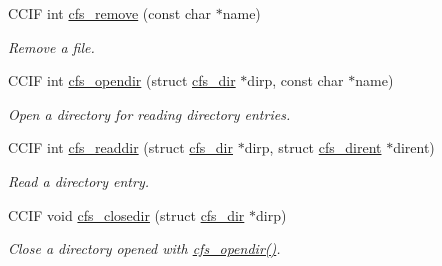 \begin{DoxyCompactItemize}
C\+C\+I\+F int \hyperlink{group__cfs_gacad1f14239db1a889ccf9804040e0d20}{cfs\+\_\+remove} (const char $\ast$name)
\begin{DoxyCompactList}\small\item\em Remove a file. \end{DoxyCompactList}\item 
C\+C\+I\+F int \hyperlink{group__cfs_gab4df33476a46ca00caf8de9cbb3e8f05}{cfs\+\_\+opendir} (struct \hyperlink{structcfs__dir}{cfs\+\_\+dir} $\ast$dirp, const char $\ast$name)
\begin{DoxyCompactList}\small\item\em Open a directory for reading directory entries. \end{DoxyCompactList}\item 
C\+C\+I\+F int \hyperlink{group__cfs_ga6367d2b762784fabea2ad1f533aa4bf4}{cfs\+\_\+readdir} (struct \hyperlink{structcfs__dir}{cfs\+\_\+dir} $\ast$dirp, struct \hyperlink{structcfs__dirent}{cfs\+\_\+dirent} $\ast$dirent)
\begin{DoxyCompactList}\small\item\em Read a directory entry. \end{DoxyCompactList}\item 
C\+C\+I\+F void \hyperlink{group__cfs_gaef17820cc7daaeac661e401ca7b3054b}{cfs\+\_\+closedir} (struct \hyperlink{structcfs__dir}{cfs\+\_\+dir} $\ast$dirp)
\begin{DoxyCompactList}\small\item\em Close a directory opened with \hyperlink{group__cfs_gab4df33476a46ca00caf8de9cbb3e8f05}{cfs\+\_\+opendir()}. \end{DoxyCompactList}\end{DoxyCompactItemize}
